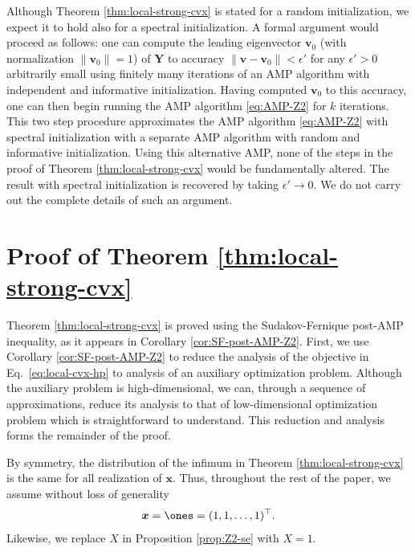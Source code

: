 \documentclass[]{article}
\def\bx{{\boldsymbol x}}
\def\bv{{\boldsymbol V}}
\def\bv{{\boldsymbol v}}
\def\bx{{\boldsymbol x}}
\def\bv{{\boldsymbol v}}
\def\bY{{\boldsymbol Y}}
\begin{document}
\begin{remark}
\label{rmk:spectral}
    Although Theorem \ref{thm:local-strong-cvx} is stated for a random initialization,
    we expect it to hold also for a spectral initialization. 
    A formal argument would proceed as follows: 
    one can compute the leading eigenvector $\bv_0$ (with normalization $\| \bv_0 \| = 1$) of $\bY$ to accuracy $\| \bv - \bv_0 \| < \epsilon'$ for any $\epsilon' > 0$ arbitrarily small using finitely many iterations of an AMP algorithm with independent and informative initialization.
    Having computed $\bv_0$ to this accuracy,
    one can then begin running the AMP algorithm \ref{eq:AMP-Z2} for $k$ iterations. 
    This two step procedure approximates the AMP algorithm \ref{eq:AMP-Z2} with spectral initialization with a separate AMP algorithm with random and informative initialization.
    Using this alternative AMP, 
    none of the steps in the proof of Theorem \ref{thm:local-strong-cvx} would be fundamentally altered.
    The result with spectral initialization is recovered by taking $\epsilon' \rightarrow 0$.
    We do not carry out the complete details of such an argument.
\end{remark}

\section{Proof of Theorem \ref{thm:local-strong-cvx}}
\label{sec:proofs}

Theorem \ref{thm:local-strong-cvx} is proved using the Sudakov-Fernique post-AMP inequality, as it appears in Corollary \ref{cor:SF-post-AMP-Z2}.
First, we use Corollary \ref{cor:SF-post-AMP-Z2} to reduce the analysis of the objective in Eq.~\eqref{eq:local-cvx-hp} to analysis of an auxiliary optimization problem.
Although the auxiliary problem is high-dimensional,
we can, through a sequence of approximations, reduce its analysis to that of low-dimensional optimization problem which is straightforward to understand.
This reduction and analysis forms the remainder of the proof.

By symmetry, the distribution of the infimum in Theorem \ref{thm:local-strong-cvx} is the same for all realization of $\bx$. 
Thus, throughout the rest of the paper, we assume without loss of generality
\begin{equation}
    \bx = \ones = (1,1,\ldots,1)^\top.
\end{equation}
Likewise, we replace $X$ in Proposition \ref{prop:Z2-se} with $X = 1$.
\end{document}
